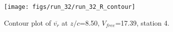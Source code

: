 \begin{figure}[H]
\centering
\texttt{[image: figs/run\_32/run\_32\_R\_contour]}
\caption{Contour plot of $\overline{v_{r}}$ at $z/c$=8.50, $V_{free}$=17.39, station 4.}
\label{fig:run_32_R_contour}
\end{figure}


